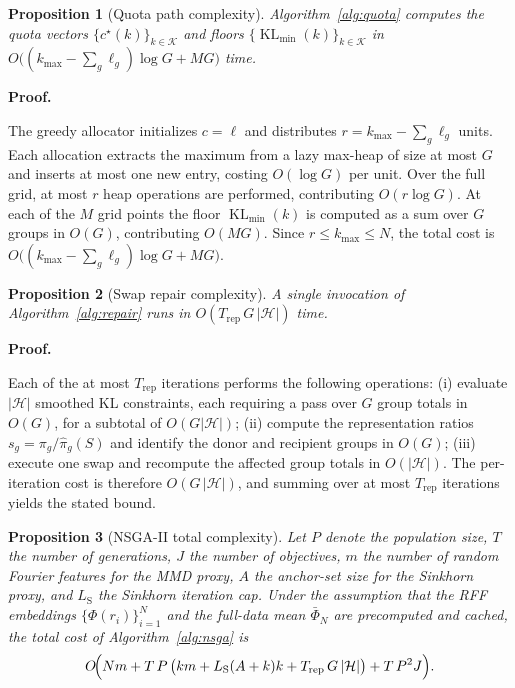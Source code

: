 \documentclass[10pt,journal]{IEEEtran}
\makeatletter
\newcommand{\1}{\mathbf{1}}
\DeclareMathOperator{\KL}{KL}
\theoremstyle{ieeethm}
\newtheorem{proposition}{Proposition}
\renewcommand{\IEEEproofname}{Proof}
\renewenvironment{IEEEproof}[1][\IEEEproofname]{%
  \par\pushQED{\IEEEQED}%
  \normalfont
  \topsep6\p@\@plus6\p@\relax
  \trivlist
  \item[]\textbf{#1.}\ignorespaces
}{%
  \popQED\endtrivlist\@endpefalse
}
\makeatother
\begin{document}
\begin{proposition}[Quota path complexity]
\label{prop:quota_complexity}
Algorithm~\ref{alg:quota} computes the quota vectors $\{c^\star(k)\}_{k\in\mathcal{K}}$
and floors $\{\KL_{\min}(k)\}_{k\in\mathcal{K}}$ in
$O\!\bigl((k_{\max}-\textstyle\sum_g\ell_g)\log G + MG\bigr)$ time.
\end{proposition}

\begin{IEEEproof}
The greedy allocator initializes $c=\ell$ and distributes
$r=k_{\max}-\sum_g\ell_g$ units. Each allocation extracts the maximum from a
lazy max-heap of size at most $G$ and inserts at most one new entry, costing
$O(\log G)$ per unit. Over the full grid, at most $r$ heap operations are
performed, contributing $O(r\log G)$. At each of the $M$ grid points the floor
$\KL_{\min}(k)$ is computed as a sum over $G$ groups in $O(G)$, contributing
$O(MG)$. Since $r \le k_{\max} \le N$, the total cost is
$O\!\bigl((k_{\max}-\sum_g\ell_g)\log G + MG\bigr)$.
\end{IEEEproof}

\begin{proposition}[Swap repair complexity]
\label{prop:repair_complexity}
A single invocation of Algorithm~\ref{alg:repair} runs in
$O(T_{\mathrm{rep}}\,G\,|\mathcal{H}|)$ time.
\end{proposition}

\begin{IEEEproof}
Each of the at most $T_{\mathrm{rep}}$ iterations performs the following
operations: (i) evaluate $|\mathcal{H}|$ smoothed KL constraints, each requiring
a pass over $G$ group totals in $O(G)$, for a subtotal of $O(G|\mathcal{H}|)$;
(ii) compute the representation ratios $s_g=\pi_g/\hat\pi_g(S)$ and identify the
donor and recipient groups in $O(G)$; (iii) execute one swap and recompute the
affected group totals in $O(|\mathcal{H}|)$. The per-iteration cost is therefore
$O(G\,|\mathcal{H}|)$, and summing over at most $T_{\mathrm{rep}}$ iterations
yields the stated bound.
\end{IEEEproof}

\begin{proposition}[NSGA-II total complexity]
\label{prop:nsga_complexity}
Let $P$ denote the population size, $T$ the number of generations, $J$ the
number of objectives, $m$ the number of random Fourier features for the MMD
proxy, $A$ the anchor-set size for the Sinkhorn proxy, and $L_{\mathrm{S}}$
the Sinkhorn iteration cap. Under the assumption that the RFF embeddings
$\{\Phi(r_i)\}_{i=1}^N$ and the full-data mean $\bar\Phi_N$ are precomputed
and cached, the total cost of Algorithm~\ref{alg:nsga} is
\[
O\!\Bigl(Nm + T\,P\,\bigl(km + L_{\mathrm{S}}(A+k)k + T_{\mathrm{rep}}\,G\,|\mathcal{H}|\bigr) + T\,P^2 J\Bigr).
\]
\end{proposition}
\end{document}
